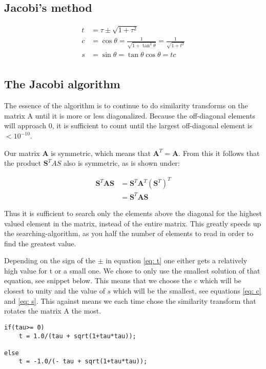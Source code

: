 \subsection{Jacobi's method}

\begin{align*}
t &= \tau \pm \sqrt{1+\tau^2}\\ 
c &= \cos \theta = \frac{1}{\sqrt{1+\tan^2\theta}} = \frac{1}{\sqrt{1+t^2}}\\
s &= \sin \theta = \tan \theta \cos \theta = t c\\
\end{align*}

\subsection{The Jacobi algorithm}

The essence of the algorithm is to continue to do similarity transforms on the matrix A until it is more or less diagonalized. Because the off-diagonal elements will approach $ 0 $, it is sufficient to count until the largest off-diagonal element is $ < 10^{-10} $. 

Our matrix \textbf{A} is symmetric, which means that $ \textbf{A}^T = \textbf{A} $. From this it follows that the product $ \textbf{S}^TAS $ also is symmetric, as is shown under:

\begin{align}
\textbf{S}^T\textbf{AS} &= \textbf{S}^T\textbf{A}^T(\textbf{S}^T)^T\\
&= \textbf{S}^T\textbf{AS} 
\end{align}

Thus  it is sufficient to search only the elements above the diagonal for the highest valued element in the matrix, instead of the entire matrix. This greatly speeds up the searching-algorithm, as you half the number of elements to read in order to find the greatest value. 

Depending on the sign of the $ \pm $ in equation \ref{eq: t} one either gets a relatively high value for t or a small one. We chose to only use the smallest solution of that equation, see snippet below.  This means that we choose the c  which will be closest to unity  and the value of $s$ which will be the smallest, see equations \ref{eq: c} and \ref{eq: s}. This against means we each time chose the similarity transform that rotates the matrix A the most. 


\begin{lstlisting}[caption={Determining $t$ in the program},label=kode]
if(tau>= 0)
	t = 1.0/(tau + sqrt(1+tau*tau));

else
	t = -1.0/(- tau + sqrt(1+tau*tau));
\end{lstlisting}

